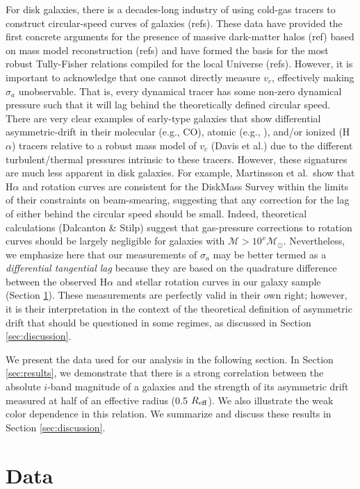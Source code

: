 \documentclass[apj,iop,revtex4,numberedappendix]{emulateapj}
\begin{document}
For disk galaxies, there is a decades-long industry of using cold-gas
tracers to construct circular-speed curves of galaxies (refs).  These
data have provided the first concrete arguments for the presence of
massive dark-matter halos (ref) based on mass model reconstruction
(refs) and have formed the basis for the most robust Tully-Fisher
relations compiled for the local Universe (refs).  However, it is
important to acknowledge that one cannot directly measure $v_c$,
effectively making $\sigma_a$ unobservable.  That is, every dynamical
tracer has some non-zero dynamical pressure such that it will lag behind
the theoretically defined circular speed.  There are very clear examples
of early-type galaxies that show differential asymmetric-drift in their
molecular (e.g., CO), atomic (e.g., ), and/or ionized
(H$\alpha$) tracers relative to a robust mass model of $v_c$ (Davis et
al.) due to the different turbulent/thermal pressures intrinsic to these
tracers.  However, these signatures are much less apparent in disk
galaxies.  For example, Martinsson et al.\ show that H$\alpha$ and
 rotation curves are consistent for the DiskMass Survey within
the limits of their constraints on beam-smearing, suggesting that any
correction for the lag of either behind the circular speed should be
small.  Indeed, theoretical calculations (Dalcanton \& Stilp) suggest
that gas-pressure corrections to  rotation curves should be
largely negligible for galaxies with ${\mathcal M} > 10^x {\mathcal
M}_\odot$.  Nevertheless, we emphasize here that our measurements of
$\sigma_a$ may be better termed as a {\em differential tangential lag}
because they are based on the quadrature difference between the observed
H$\alpha$ and stellar rotation curves in our galaxy sample (Section
\ref{sec:data}).  These measurements are perfectly valid in their own
right; however, it is their interpretation in the context of the
theoretical definition of asymmetric drift that should be questioned in
some regimes, as discussed in Section \ref{sec:discussion}.

We present the data used for our analysis in the following section.  In
Section \ref{sec:results}, we demonstrate that there is a strong
correlation between the absolute $i$-band magnitude of a galaxies and
the strength of its asymmetric drift measured at half of an effective
radius (0.5 $R_{\rm eff}$).  We also illustrate the weak color
dependence in this relation.  We summarize and discuss these results in
Section \ref{sec:discussion}.

\section{Data}
\label{sec:data}
\end{document}
